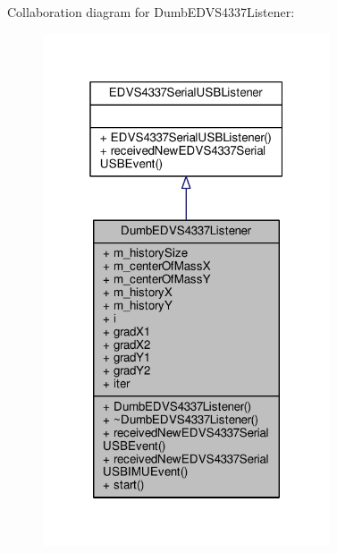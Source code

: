 Collaboration diagram for Dumb\+E\+D\+V\+S4337\+Listener\+:
\nopagebreak
\begin{figure}[H]
\begin{center}
\leavevmode
\includegraphics[width=241pt]{class_dumb_e_d_v_s4337_listener__coll__graph}
\end{center}
\end{figure}
